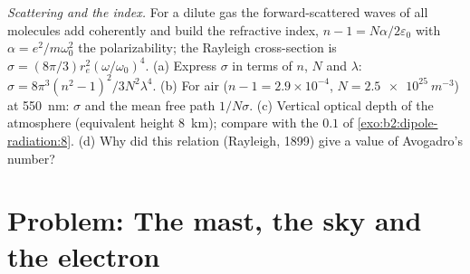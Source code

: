 \begin{exercise}[$\star\star\star$]\label{exo:b2:dipole-radiation:12}
\emph{Scattering and the index.} For a dilute gas the forward-scattered
waves of all molecules add coherently and build the refractive index,
$n - 1 = N\alpha/2\varepsilon_0$ with $\alpha = e^2/m\omega_0^2$ the polarizability; the
Rayleigh cross-section is $\sigma = (8\pi/3)r_e^2(\omega/\omega_0)^4$. (a) Express
$\sigma$ in terms of $n$, $N$ and $\lambda$: $\sigma = 8\pi^3(n^2 - 1)^2/3N^2\lambda^4$. (b)
For air ($n - 1 = 2.9 \times 10^{-4}$, $N = \qty{2.5e25}{m^{-3}}$) at \qty{550}{nm}:
$\sigma$ and the mean free path $1/N\sigma$. (c) Vertical optical depth of the
atmosphere (equivalent height \qty{8}{km}); compare with the $0.1$ of
\cref{exo:b2:dipole-radiation:8}. (d) Why did this relation (Rayleigh,
1899) give a value of Avogadro's number?
\end{exercise}

\section{Problem: The mast, the sky and the electron}

